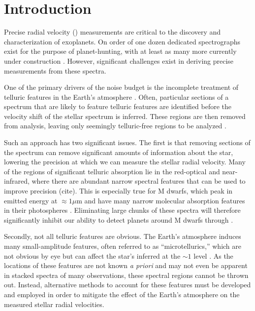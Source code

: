 \documentclass[modern]{aastex62}
\begin{document}
\section{Introduction}

Precise radial velocity (\RV) measurements are critical to the discovery and characterization of exoplanets. 
On order of one dozen dedicated spectrographs exist for the purpose of \RV planet-hunting, with at least as many more currently under construction \citep{Wright2017}. 
However, significant challenges exist in deriving precise \RV measurements from these spectra. 

One of the primary drivers of the \RV noise budget is the incomplete treatment of telluric features in the
Earth's atmosphere \citep{Halverson2016}. 
Often, particular sections of a spectrum that are likely to feature telluric features are identified before the velocity shift of the stellar spectrum is inferred. 
These regions are then removed from analysis, leaving only seemingly telluric-free regions to be analyzed \citep[e.g.][]{AngladaEscude2012}.

Such an approach has two significant issues. 
The first is that removing sections of the spectrum can remove significant amounts of information about the star, lowering the precision at which we can measure the stellar radial velocity. 
Many of the regions of significant telluric absorption lie in the red-optical and near-infrared, where there are abundant narrow spectral features that can be used to improve \RV precision (cite). 
This is especially true for M dwarfs, which peak in emitted energy at $\approx 1 \mu$m and have many narrow molecular absorption features in their photospheres \citep{Figueira2016}. 
Eliminating large chunks of these spectra will therefore significantly inhibit our ability to detect planets around M dwarfs through \RVs.

Secondly, not all telluric features are obvious. 
The Earth's atmosphere induces many small-amplitude features, often referred to as ``microtellurics,'' which are not obvious by eye but can affect the star's inferred \RV at the $\sim 1$ \ms level \citep{Cunha2014}. 
As the locations of these features are not known \textit{a priori} and may not even be apparent in stacked spectra of many observations, these spectral regions cannot be thrown out. 
Instead, alternative methods to account for these features must be developed and employed in order to mitigate the effect of the Earth's atmosphere on the measured stellar radial velocities.
\end{document}
